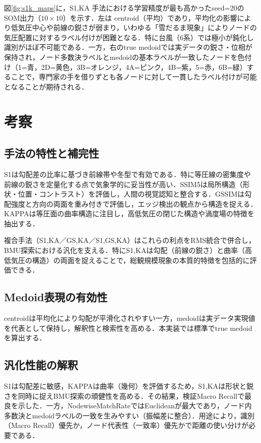 \documentclass{jarticle}
\theoremstyle{definition}
\begin{document}
図\ref{fig:s1k_maps}に，S1,KA 手法における学習精度が最も高かったseed=20のSOM出力（$10\times 10$）を示す．左は centroid（平均）であり，平均化の影響により低気圧中心や前線の鋭さが弱まり，いわゆる「雪だるま現象」によりノードの気圧配置に対するラベル付けが困難となる．特に台風（6系）では極小が鈍化し識別がほぼ不可能である．一方，右のtrue medoidでは実データの鋭さ・位相が保持され，ノード多数決ラベルとmedoidの基本ラベルが一致したノードを色付け（1=青，2D=黄色，3B=オレンジ，4A=ピンク，4B=紫，5=赤，6B=緑）することで，専門家の手を借りずとも各ノードに対して一貫したラベル付けが可能となることが期待される．

\section{考察}
\subsection{手法の特性と補完性}
S1は勾配差の比率に基づき前線帯や冬型で有効である．特に等圧線の密集度や前線の鋭さを定量化する点で気象学的に妥当性が高い．SSIM5は局所構造（形状・位置・コントラスト）を評価し，人間の視覚認知と整合する．GSSIMは勾配強度と方向の両面を重み付きで評価し，エッジ検出の観点から構造を捉える．KAPPAは等圧面の曲率構造に注目し，高低気圧の閉じた構造や渦度場の特徴を抽出する．

複合手法（S1,KA／GS,KA／S1,GS,KA）はこれらの利点をRMS統合で併合し，BMU探索における汎化を支える．特にS1,KAは勾配（前線の鋭さ）と曲率（高低気圧の構造）の両面を捉えることで，総観規模現象の本質的特徴を包括的に評価できる．

\subsection{Medoid表現の有効性}
centroidは平均化により勾配が平滑化されやすい一方，medoidは実データ実現値を代表として保持し，解釈性と検索性を高める．本実装では標準でtrue medoidを算出する．

\subsection{汎化性能の解釈}
S1は勾配差に敏感，KAPPAは曲率（幾何）を評価するため，S1,KAは形状と鋭さを同時に捉えBMU探索の頑健性を高める．その結果，検証Macro Recallで最良を示した．一方，NodewiseMatchRateではEuclideanが最大であり，ノード内多数決とmedoidラベルの一致を生みやすい（振幅差に整合）．用途により，識別（Macro Recall）優先か，ノード代表性（一致率）優先かで距離の使い分けが必要である．
\end{document}
